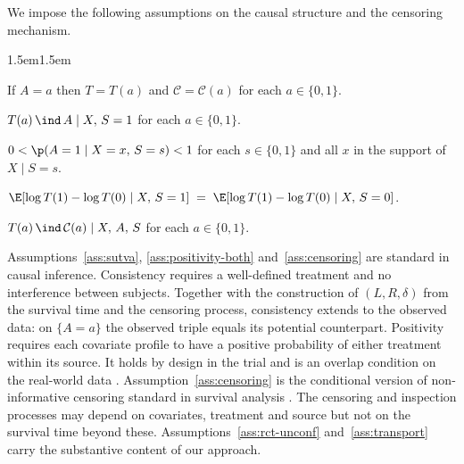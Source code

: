 We impose the following assumptions on the causal structure and the censoring mechanism.
\vspace*{-\parskip}
\begin{adjustwidth}{1.5em}{1.5em}
\setlength{\parskip}{0pt}
\begin{assumption}[Consistency]\label{ass:sutva}
If $A = a$ then $T = T(a)$ and $\mathcal{C} = \mathcal{C}(a)$ for each $a \in \{0, 1\}$.
\end{assumption}

\begin{assumption}\label{ass:rct-unconf}
$T(a) \,\ind\, A \mid X,\, S = 1$ for each $a\in\{0, 1\}$.
\end{assumption}

\begin{assumption}[Positivity]\label{ass:positivity-both}
$0 < \p(A = 1 \mid X = x,\, S = s) < 1$ for each $s \in \{0, 1\}$ and all $x$ in the support of $X \mid S = s$.
\end{assumption}

\begin{assumption}\label{ass:transport}
$\E[\log T(1) - \log T(0) \mid X,\, S = 1] \;=\; \E[\log T(1) - \log T(0) \mid X,\, S = 0]$.
\end{assumption}

\begin{assumption}\label{ass:censoring}
$T(a) \,\ind\, \mathcal{C}(a) \mid X,\, A,\, S$ for each $a\in\{0, 1\}$.
\end{assumption}

\end{adjustwidth}
\setlength{\parskip}{0.8em}
\vspace{0.8em}


Assumptions~\ref{ass:sutva}, \ref{ass:positivity-both} and~\ref{ass:censoring} are standard in causal inference.
Consistency requires a well-defined treatment and no interference between subjects.
Together with the construction of $(L, R, \delta)$ from the survival time and the censoring process, consistency extends to the observed data: on $\{A = a\}$ the observed triple equals its potential counterpart.
Positivity requires each covariate profile to have a positive probability of either treatment within its source.
It holds by design in the trial and is an overlap condition on the real-world data \citep{dahabreh2019generalizing}.
Assumption~\ref{ass:censoring} is the conditional version of non-informative censoring standard in survival analysis \citep{sun2006statistical}.
The censoring and inspection processes may depend on covariates, treatment and source but not on the survival time beyond these.
Assumptions~\ref{ass:rct-unconf} and~\ref{ass:transport} carry the substantive content of our approach.

